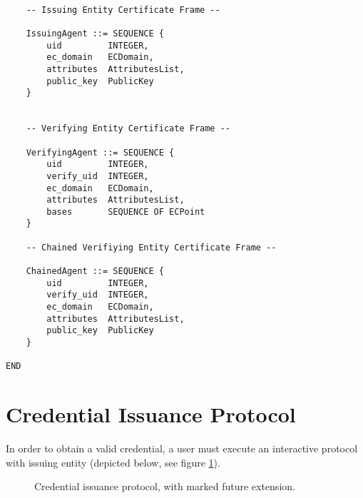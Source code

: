 \begin{verbatim}
    
    -- Issuing Entity Certificate Frame --
    
    IssuingAgent ::= SEQUENCE {
        uid         INTEGER,
        ec_domain   ECDomain,
        attributes  AttributesList,
        public_key  PublicKey
    }
    
    
    -- Verifying Entity Certificate Frame --
    
    VerifyingAgent ::= SEQUENCE {
        uid         INTEGER,
        verify_uid  INTEGER,
        ec_domain   ECDomain,
        attributes  AttributesList,
        bases       SEQUENCE OF ECPoint
    }
    
    -- Chained Verifiying Entity Certificate Frame --
    
    ChainedAgent ::= SEQUENCE {
        uid         INTEGER,
        verify_uid  INTEGER,
        ec_domain   ECDomain,
        attributes  AttributesList,
        public_key  PublicKey
    }
    
END
\end{verbatim}


\clearpage
\section{Credential Issuance Protocol}

In order to obtain a valid credential, a user must execute an interactive protocol with issuing entity (depicted below, see figure \ref{tech:issue-protocol}).

\begin{figure}[h]
\centering
{}

\caption{Credential issuance protocol, with marked future extension.}
\label{tech:issue-protocol}
\end{figure}


